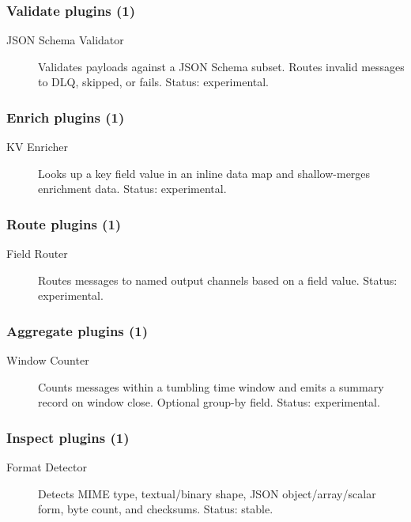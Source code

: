\subsubsection{Validate plugins (1)}

\begin{description}
\item[JSON Schema Validator] Validates payloads against a JSON Schema subset. Routes invalid messages to DLQ, skipped, or fails. Status: experimental.
\end{description}

\subsubsection{Enrich plugins (1)}

\begin{description}
\item[KV Enricher] Looks up a key field value in an inline data map and shallow-merges enrichment data. Status: experimental.
\end{description}

\subsubsection{Route plugins (1)}

\begin{description}
\item[Field Router] Routes messages to named output channels based on a field value. Status: experimental.
\end{description}

\subsubsection{Aggregate plugins (1)}

\begin{description}
\item[Window Counter] Counts messages within a tumbling time window and emits a summary record on window close. Optional group-by field. Status: experimental.
\end{description}

\subsubsection{Inspect plugins (1)}

\begin{description}
\item[Format Detector] Detects MIME type, textual/binary shape, JSON object/array/scalar form, byte count, and checksums. Status: stable.
\end{description}

